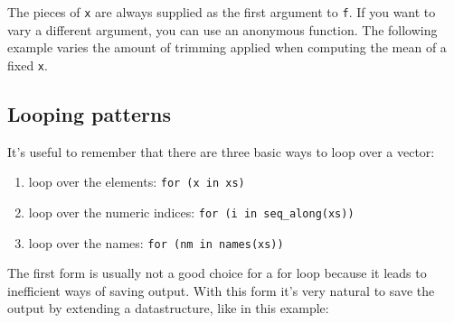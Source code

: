 The pieces of \texttt{x} are always supplied as the first argument to
\texttt{f}. If you want to vary a different argument, you can use an
anonymous function. The following example varies the amount of trimming
applied when computing the mean of a fixed \texttt{x}.

\begin{Shaded}
\begin{Highlighting}[]
\StringTok{ }\NormalTok{(}\NormalTok{, }\NormalTok{, }\NormalTok{, }\NormalTok{)}
\StringTok{ }\NormalTok{(}\NormalTok{)}
\NormalTok{(} 
\end{Highlighting}
\end{Shaded}

\subsection{Looping patterns}

It's useful to remember that there are three basic ways to loop over a
vector: 

\begin{enumerate}
\def\labelenumi{\arabic{enumi}.}
\itemsep1pt\parskip0pt
\item
  loop over the elements: \texttt{for (x in xs)}
\item
  loop over the numeric indices: \texttt{for (i in seq\_along(xs))}
\item
  loop over the names: \texttt{for (nm in names(xs))}
\end{enumerate}

The first form is usually not a good choice for a for loop because it
leads to inefficient ways of saving output. With this form it's very
natural to save the output by extending a datastructure, like in this
example:

\begin{Shaded}
\begin{Highlighting}[]
\StringTok{ }\NormalTok{(}\NormalTok{)}
\StringTok{ }\NormalTok{()}
  \StringTok{ }
\NormalTok{\}}
\end{Highlighting}
\end{Shaded}

